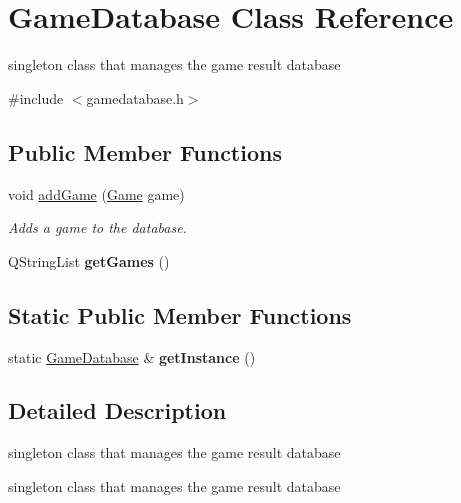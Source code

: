 \hypertarget{classGameDatabase}{\section{\-Game\-Database \-Class \-Reference}
\label{classGameDatabase}
}


singleton class that manages the game result database  




{\ttfamily \#include $<$gamedatabase.\-h$>$}

\subsection*{\-Public \-Member \-Functions}
\begin{DoxyCompactItemize}
\item 
void \hyperlink{classGameDatabase_aa2e298187a235ff09b53444b65ef806c}{add\-Game} (\hyperlink{structGame}{\-Game} game)
\begin{DoxyCompactList}\small\item\em \-Adds a game to the database. \end{DoxyCompactList}\item 
\hypertarget{classGameDatabase_a11efba57db9c500a523ce51cd156dd35}{\-Q\-String\-List {\bfseries get\-Games} ()}\label{classGameDatabase_a11efba57db9c500a523ce51cd156dd35}

\end{DoxyCompactItemize}
\subsection*{\-Static \-Public \-Member \-Functions}
\begin{DoxyCompactItemize}
\item 
\hypertarget{classGameDatabase_a216477b314b74b86d42c943b359ac33a}{static \hyperlink{classGameDatabase}{\-Game\-Database} \& {\bfseries get\-Instance} ()}\label{classGameDatabase_a216477b314b74b86d42c943b359ac33a}

\end{DoxyCompactItemize}


\subsection{\-Detailed \-Description}
singleton class that manages the game result database 

singleton class that manages the game result database

